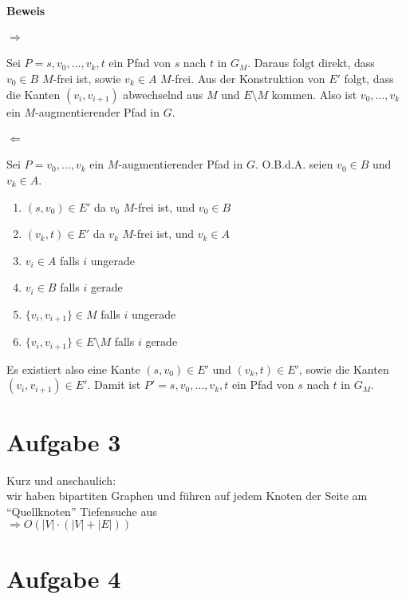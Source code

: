 \documentclass[10pt,a4paper]{article}
\begin{document}
\paragraph{Beweis}

\paragraph{$\Rightarrow$}
Sei $P = s, v_0, \ldots, v_k, t$ ein Pfad von $s$ nach $t$ in $G_M$.
Daraus folgt direkt, dass $v_0 \in B$ $M$-frei ist, sowie $v_k \in A$ $M$-frei.
Aus der Konstruktion von $E'$ folgt, dass die Kanten $(v_i, v_{i+1})$ abwechselnd aus $M$ und $E \setminus M$ kommen.
Also ist $v_0, \ldots, v_k$ ein $M$-augmentierender Pfad in $G$.

\paragraph{$\Leftarrow$}
Sei $P = v_0, \ldots, v_k$ ein $M$-augmentierender Pfad in $G$. O.B.d.A. seien $v_0 \in B$ und $v_k \in A$.
\begin{enumerate}
	\item $(s, v_0) \in E'$ da $v_0$ $M$-frei ist, und $v_0 \in B$
	\item $(v_k, t) \in E'$ da $v_k$ $M$-frei ist, und $v_k \in A$
	\item $v_i \in A$ falls $i$ ungerade
	\item $v_i \in B$ falls $i$ gerade
	\item $\{v_i, v_{i+1}\} \in M$ falls $i$ ungerade
	\item $\{v_i, v_{i+1}\} \in E \setminus M$ falls $i$ gerade
\end{enumerate}
Es existiert also eine Kante $(s, v_0) \in E'$ und $(v_k, t) \in E'$,
sowie die Kanten $(v_i, v_{i+1}) \in E'$.
Damit ist $P' = s, v_0, \ldots, v_k, t $ ein Pfad von $s$ nach $t$ in $G_M$.


\section*{Aufgabe 3}
    
    Kurz und anschaulich: \\
    wir haben bipartiten Graphen und führen auf jedem
    Knoten der Seite am ``Quellknoten'' Tiefensuche aus \\
    $\Rightarrow O(|V| \cdot (|V| + |E|))$
    

\section*{Aufgabe 4}
\end{document}

